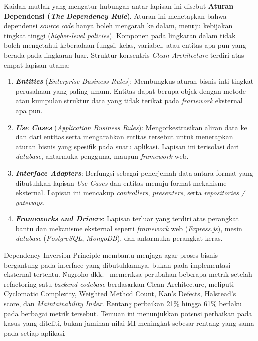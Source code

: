 \documentclass[12pt,a4paper,oneside]{report}
\begin{document}
Kaidah mutlak yang mengatur hubungan antar-lapisan ini disebut \textbf{Aturan Dependensi (\textit{The Dependency Rule})}. Aturan ini menetapkan bahwa dependensi \textit{source code} hanya boleh mengarah ke dalam, menuju kebijakan tingkat tinggi (\textit{higher-level policies}). Komponen pada lingkaran dalam tidak boleh mengetahui keberadaan fungsi, kelas, variabel, atau entitas apa pun yang berada pada lingkaran luar. Struktur konsentris \textit{Clean Architecture} terdiri atas empat lapisan utama:
\begin{enumerate}
    \item \textbf{\textit{Entities}} (\textit{Enterprise Business Rules}): Membungkus aturan bisnis inti tingkat perusahaan yang paling umum. Entitas dapat berupa objek dengan metode atau kumpulan struktur data yang tidak terikat pada \textit{framework} eksternal apa pun.
    \item \textbf{\textit{Use Cases}} (\textit{Application Business Rules}): Mengorkestrasikan aliran data ke dan dari entitas serta mengarahkan entitas tersebut untuk menerapkan aturan bisnis yang spesifik pada suatu aplikasi. Lapisan ini terisolasi dari \textit{database}, antarmuka pengguna, maupun \textit{framework} web.
    \item \textbf{\textit{Interface Adapters}}: Berfungsi sebagai penerjemah data antara format yang dibutuhkan lapisan \textit{Use Cases} dan entitas menuju format mekanisme eksternal. Lapisan ini mencakup \textit{controllers}, \textit{presenters}, serta \textit{repositories / gateways}.
    \item \textbf{\textit{Frameworks and Drivers}}: Lapisan terluar yang terdiri atas perangkat bantu dan mekanisme eksternal seperti \textit{framework} web (\textit{Express.js}), mesin \textit{database} (\textit{PostgreSQL}, \textit{MongoDB}), dan antarmuka perangkat keras.
\end{enumerate}

Dependency Inversion Principle membantu menjaga agar proses bisnis bergantung pada interface yang dibutuhkannya, bukan pada implementasi eksternal tertentu. Nugroho dkk.\ \cite{nugroho2022clean} memeriksa perubahan beberapa metrik setelah refactoring satu \textit{backend \textit{codebase}} berdasarkan Clean Architecture, meliputi Cyclomatic Complexity, Weighted Method Count, Kan's Defects, Halstead's score, dan \textit{Maintainability Index}. Rentang perbaikan 21\% hingga 61\% berlaku pada berbagai metrik tersebut. Temuan ini menunjukkan potensi perbaikan pada kasus yang diteliti, bukan jaminan nilai MI meningkat sebesar rentang yang sama pada setiap aplikasi.
\end{document}
